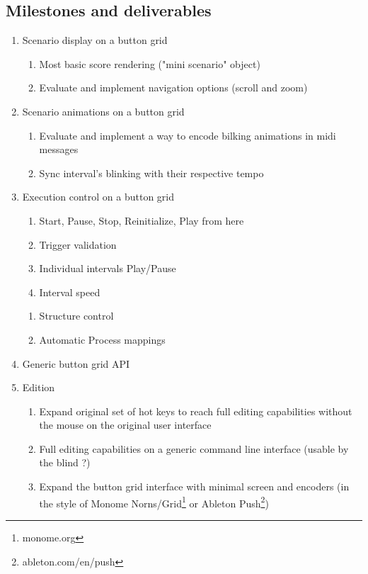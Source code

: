 \documentclass[journal,onecolumn]{IEEEtran}
\begin{document}
\subsection{Milestones and deliverables}
\begin{enumerate}
    \item Scenario display on a button grid
    \begin{enumerate}
        \item Most basic score rendering ("mini scenario" object) 
        \item Evaluate and implement navigation options (scroll and zoom)
    \end{enumerate}
    \item Scenario animations on a button grid
    \begin{enumerate}
        \item Evaluate and implement a way to encode bilking animations in midi messages
        \item Sync interval's blinking with their respective tempo
    \end{enumerate}
    \item Execution control on a button grid
    \begin{enumerate}
        \item Start, Pause, Stop, Reinitialize, Play from here
        \item Trigger validation
        \item Individual intervals Play/Pause 
        \item Interval speed
    \end{enumerate}
    \begin{enumerate}
        \item Structure control
        \item Automatic Process mappings
    \end{enumerate}
    \item Generic button grid API
    \item Edition
    \begin{enumerate}
        \item Expand original set of hot keys to reach full editing capabilities without the mouse on the original user interface
        \item Full editing capabilities on a generic command line interface (usable by the blind ?)
        \item Expand the button grid interface with minimal screen and encoders (in the style of Monome Norns/Grid\footnote{monome.org} or Ableton Push\footnote{ableton.com/en/push})

\end{enumerate}
\end{enumerate}
\end{document}
